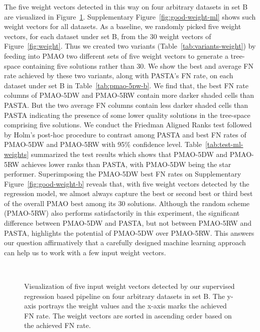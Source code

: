The five weight vectors detected in this way on four arbitrary datasets in set B are visualized in Figure~\ref{fig:some-good-weight-ml}. Supplementary Figure~\ref{fig:good-weight-ml} shows such weight vectors for all datasets. As a baseline, we randomly picked five weight vectors, for each dataset under set B, from the 30 weight vectors of Figure~\ref{fig:weight}. Thus we created two variants (Table~\ref{tab:variants-weight}) by feeding into PMAO two different sets of five weight vectors to generate a tree-space containing five solutions rather than 30. We show the best and average FN rate achieved by these two variants, along with PASTA's FN rate, on each dataset under set B in Table~\ref{tab:pmao-5pw-b}. We find that, the best FN rate columns of PMAO-5DW and PMAO-5RW contain more darker shaded cells than PASTA. But the two average FN columns contain less darker shaded cells than PASTA indicating the presence of some lower quality solutions in the tree-space comprising five solutions. We conduct the Friedman Aligned Ranks test followed by Holm's post-hoc procedure to contrast among PASTA and best FN rates of PMAO-5DW and PMAO-5RW with 95\% confidence level. Table~\ref{tab:test-ml-weights} summarized the test results which shows that PMAO-5DW and PMAO-5RW achieves lower ranks than PASTA, with PMAO-5DW being the star performer. Superimposing the PMAO-5DW best FN rates on Supplementary Figure~\ref{fig:good-weight-b} reveals that, with five weight vectors detected by the regression model, we almost always capture the best or second best or third best of the overall PMAO best among its 30 solutions.
Although the random scheme (PMAO-5RW) also performs satisfactorily in this experiment, the significant difference between PMAO-5DW and PASTA, but not between PMAO-5RW and PASTA, highlights the potential of PMAO-5DW over PMAO-5RW. This answers our question affirmatively that a carefully designed machine learning approach can help us to work with a few input weight vectors.

\begin{figure}[!htbp]%
	\begin{adjustwidth}{-0.6cm}{}
		\centering
		\\
	\end{adjustwidth}
	\caption{Visualization of five input weight vectors detected by our supervised regression based pipeline on four arbitrary datasets in set B. The y-axis portrays the weight values and the x-axis marks the achieved FN rate. The weight vectors are sorted in ascending order based on the achieved FN rate. }
	\label{fig:some-good-weight-ml}
\end{figure}

